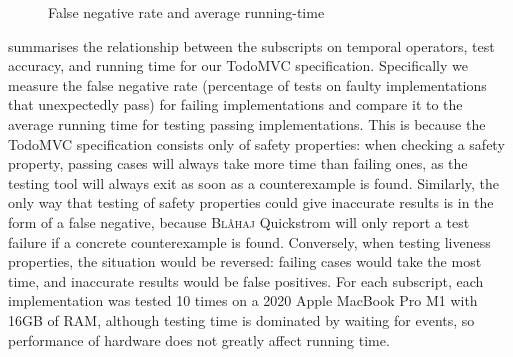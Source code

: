 \documentclass[sigplan,nonacm,10pt]{acmart}
\makeatletter
\newcommand{\Quickstrom}[0]{%
  \if@ACM@anonymous%
  \textsc{Bl\aa{}haj}%
  \else%
  Quickstrom%
  \fi\xspace}
\makeatother
\begin{document}
\begin{figure}

    
  \caption{False negative rate and average running-time}
  \label{fig:graph}
\end{figure}

 summarises the relationship between the subscripts on temporal operators, test accuracy, and running time for our TodoMVC specification.
Specifically we measure the false negative rate (percentage of tests on faulty implementations that unexpectedly pass) for failing implementations and compare 
it to the average running time for testing passing implementations. This is because the TodoMVC specification consists only of safety properties: when checking a safety property, 
passing cases will always take more time than failing ones, as the testing tool will always exit as soon as a counterexample is found. Similarly, the only way that testing of safety properties 
could give inaccurate results is in the form of a false negative, because \Quickstrom will only report a test failure if a concrete counterexample is found. 
Conversely, when testing liveness properties, the situation would be reversed: failing cases would take the most time, and inaccurate results would be false positives.
For each subscript, each implementation was tested 10 times on a 2020 Apple MacBook Pro M1 with 16GB of RAM, although testing time is dominated by waiting for events, so performance of 
hardware does not greatly affect running time.
\end{document}
